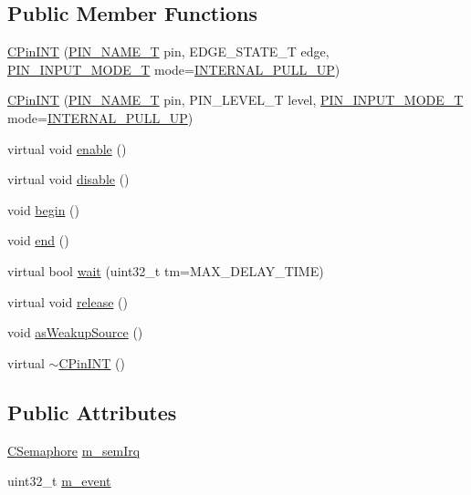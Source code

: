 \subsection*{Public Member Functions}
\begin{DoxyCompactItemize}
\item 
\hyperlink{class_c_pin_i_n_t_a71f5452b1d99597b04082bf402f4ae59}{C\-Pin\-I\-N\-T} (\hyperlink{group___peripheral_ga65a2241721e4acb573e0c3fe29ac432f}{P\-I\-N\-\_\-\-N\-A\-M\-E\-\_\-\-T} pin, E\-D\-G\-E\-\_\-\-S\-T\-A\-T\-E\-\_\-\-T edge, \hyperlink{group___peripheral_gad5705547b72a4480dc714447b3bbfb64}{P\-I\-N\-\_\-\-I\-N\-P\-U\-T\-\_\-\-M\-O\-D\-E\-\_\-\-T} mode=\hyperlink{group___peripheral_gga16ce6180d8bb2eb23a7df8f8923ea581a781a7f23ae9b0dbdc6edfdcfd3be75df}{I\-N\-T\-E\-R\-N\-A\-L\-\_\-\-P\-U\-L\-L\-\_\-\-U\-P})
\item 
\hyperlink{class_c_pin_i_n_t_a48e6afdca1e70de51e292d1d3c4bafc5}{C\-Pin\-I\-N\-T} (\hyperlink{group___peripheral_ga65a2241721e4acb573e0c3fe29ac432f}{P\-I\-N\-\_\-\-N\-A\-M\-E\-\_\-\-T} pin, P\-I\-N\-\_\-\-L\-E\-V\-E\-L\-\_\-\-T level, \hyperlink{group___peripheral_gad5705547b72a4480dc714447b3bbfb64}{P\-I\-N\-\_\-\-I\-N\-P\-U\-T\-\_\-\-M\-O\-D\-E\-\_\-\-T} mode=\hyperlink{group___peripheral_gga16ce6180d8bb2eb23a7df8f8923ea581a781a7f23ae9b0dbdc6edfdcfd3be75df}{I\-N\-T\-E\-R\-N\-A\-L\-\_\-\-P\-U\-L\-L\-\_\-\-U\-P})
\item 
virtual void \hyperlink{class_c_pin_i_n_t_a36d2301b10290741be6d3dd86dbc534b}{enable} ()
\item 
virtual void \hyperlink{class_c_pin_i_n_t_a08521d6d6892b7a80452bfce7db03e2b}{disable} ()
\item 
void \hyperlink{class_c_pin_i_n_t_a811526191ebf7ba17f0f51dea004d37b}{begin} ()
\item 
void \hyperlink{class_c_pin_i_n_t_a9f65ac4a7485b63e46b232f8d7ab385f}{end} ()
\item 
virtual bool \hyperlink{class_c_pin_i_n_t_a45e9fb4b6e6300e4c1c2ed6c13cfc062}{wait} (uint32\-\_\-t tm=M\-A\-X\-\_\-\-D\-E\-L\-A\-Y\-\_\-\-T\-I\-M\-E)
\item 
virtual void \hyperlink{class_c_pin_i_n_t_abe0ce7ac090423e11d460e75c8838128}{release} ()
\item 
void \hyperlink{class_c_pin_i_n_t_ae30634b8f9107d2ce4b6c3a52aeb380a}{as\-Weakup\-Source} ()
\item 
virtual \hyperlink{class_c_pin_i_n_t_ab75df389802ed381ac35726196ee15bb}{$\sim$\-C\-Pin\-I\-N\-T} ()
\end{DoxyCompactItemize}
\subsection*{Public Attributes}
\begin{DoxyCompactItemize}
\item 
\hyperlink{class_c_semaphore}{C\-Semaphore} \hyperlink{class_c_pin_i_n_t_a183f478d30ac65d5a3e85c7939db044e}{m\-\_\-sem\-Irq}
\item 
uint32\-\_\-t \hyperlink{class_c_pin_i_n_t_a53b3ac0896504d345f4b6093cb22f3f3}{m\-\_\-event}
\end{DoxyCompactItemize}
